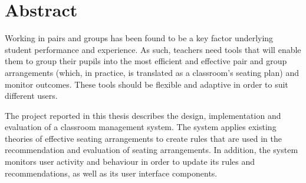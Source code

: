 \section*{Abstract}

Working in pairs and groups has been found to be a key factor underlying student performance and experience. As such, teachers need tools that will enable them to group their pupils into the most efficient and effective pair and group arrangements (which, in practice, is translated as a classroom's seating plan) and monitor outcomes. These tools should be flexible and adaptive in order to suit different users.


The project reported in this thesis describes the design, implementation and evaluation of a classroom management system. The system applies existing theories of effective seating arrangements to create rules that are used in the recommendation and evaluation of seating arrangements. In addition, the system monitors user activity and behaviour in order to update its rules and recommendations, as well as its user interface components.
